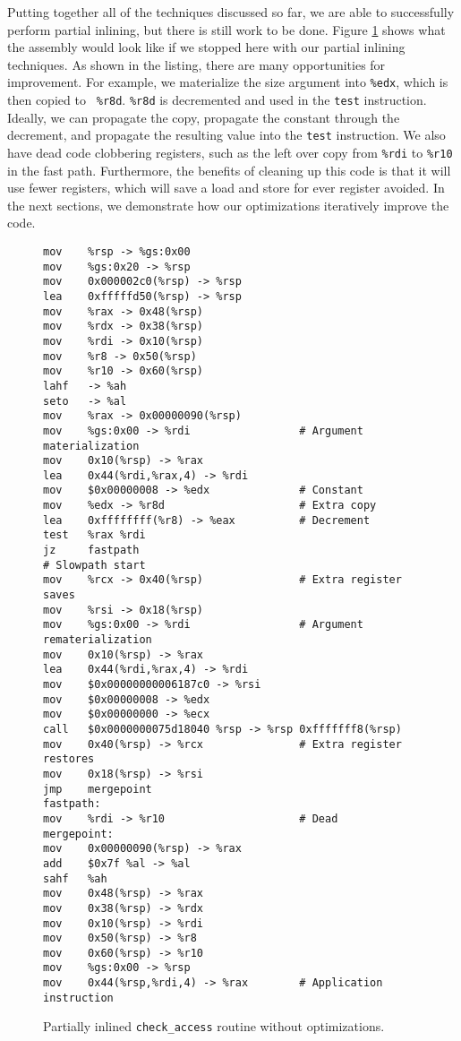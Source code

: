 Putting together all of the techniques discussed so far, we are able to
successfully perform partial inlining, but there is still work to be done.
Figure \ref{fig:alignment_partial_noopt} shows what the assembly would look like
if we stopped here with our partial inlining techniques.  As shown in the
listing, there are many opportunities for improvement.  For example, we
materialize the size argument into {\tt \%edx}, which is then copied to {\tt
\%r8d}.  {\tt \%r8d} is decremented and used in the {\tt test} instruction.
Ideally, we can propagate the copy, propagate the constant through the
decrement, and propagate the resulting value into the {\tt test} instruction.
We also have dead code clobbering registers, such as the left over copy from
{\tt \%rdi} to {\tt \%r10} in the fast path.  Furthermore, the benefits of
cleaning up this code is that it will use fewer registers, which will save a
load and store for ever register avoided.  In the next sections, we demonstrate
how our optimizations iteratively improve the code.

\begin{figure}
\begin{verbatim}
mov    %rsp -> %gs:0x00
mov    %gs:0x20 -> %rsp
mov    0x000002c0(%rsp) -> %rsp
lea    0xfffffd50(%rsp) -> %rsp
mov    %rax -> 0x48(%rsp)
mov    %rdx -> 0x38(%rsp)
mov    %rdi -> 0x10(%rsp)
mov    %r8 -> 0x50(%rsp)
mov    %r10 -> 0x60(%rsp)
lahf   -> %ah
seto   -> %al
mov    %rax -> 0x00000090(%rsp)
mov    %gs:0x00 -> %rdi                 # Argument materialization
mov    0x10(%rsp) -> %rax
lea    0x44(%rdi,%rax,4) -> %rdi
mov    $0x00000008 -> %edx              # Constant
mov    %edx -> %r8d                     # Extra copy
lea    0xffffffff(%r8) -> %eax          # Decrement
test   %rax %rdi
jz     fastpath
# Slowpath start
mov    %rcx -> 0x40(%rsp)               # Extra register saves
mov    %rsi -> 0x18(%rsp)
mov    %gs:0x00 -> %rdi                 # Argument rematerialization
mov    0x10(%rsp) -> %rax
lea    0x44(%rdi,%rax,4) -> %rdi
mov    $0x00000000006187c0 -> %rsi
mov    $0x00000008 -> %edx
mov    $0x00000000 -> %ecx
call   $0x0000000075d18040 %rsp -> %rsp 0xfffffff8(%rsp)
mov    0x40(%rsp) -> %rcx               # Extra register restores
mov    0x18(%rsp) -> %rsi
jmp    mergepoint
fastpath:
mov    %rdi -> %r10                     # Dead
mergepoint:
mov    0x00000090(%rsp) -> %rax
add    $0x7f %al -> %al
sahf   %ah
mov    0x48(%rsp) -> %rax
mov    0x38(%rsp) -> %rdx
mov    0x10(%rsp) -> %rdi
mov    0x50(%rsp) -> %r8
mov    0x60(%rsp) -> %r10
mov    %gs:0x00 -> %rsp
mov    0x44(%rsp,%rdi,4) -> %rax        # Application instruction
\end{verbatim}
\caption{Partially inlined {\tt check\_access} routine without optimizations.}
\label{fig:alignment_partial_noopt}
\end{figure}

